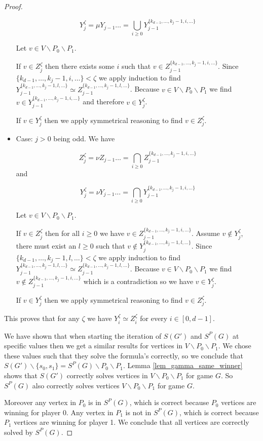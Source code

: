 \begin{theorem}
\begin{proof}
\begin{itemize}
			\[ Y_j^{\zeta} = \mu Y_{j-1}\dots = \bigcup_{i\geq 0} Y_{j-1}^{\{k_{d-1},\dots,k_j-1,i,\dots\}}\]
			
			Let $v \in V \backslash P_0 \backslash P_1$.
			
			If $v \in Z_j^{\zeta}$ then there exists some $i$ such that $v \in Z_{j-1}^{\{k_{d-1},\dots,k_j-1,i,\dots\}}$. Since $\{k_{d-1},\dots,k_j-1,i,\dots\} < \zeta$ we apply induction to find $Y_{j-1}^{\{k_{d-1},\dots,k_j-1,l,\dots\}} \simeq Z_{j-1}^{\{k_{d-1},\dots,k_j-1,l,\dots\}}$. Because $v \in V \backslash P_0 \backslash P_1$ we find $v \in Y_{j-1}^{\{k_{d-1},\dots,k_j-1,i,\dots\}}$ and therefore $v \in Y_j^{\zeta}$.
			
			If $v \in Y_j^{\zeta}$ then we apply symmetrical reasoning to find $v \in Z_j^{\zeta}$.
			\item Case: $j > 0$ being odd. We have 
			
			\[ Z_j^{\zeta} = \nu Z_{j-1}\dots = \bigcap_{i\geq 0} Z_{j-1}^{\{k_{d-1},\dots,k_j-1,i,\dots\}}\]
			and 
			
			\[ Y_j^{\zeta} = \nu Y_{j-1}\dots = \bigcap_{i\geq 0} Y_{j-1}^{\{k_{d-1},\dots,k_j-1,i,\dots\}}\]
			
			Let $v \in V \backslash P_0 \backslash P_1$.
			
			If $v \in Z_j^{\zeta}$ then for all $i \geq 0$ we have $v \in Z_{j-1}^{\{k_{d-1},\dots,k_j-1,i,\dots\}}$. Assume $v \notin Y_j^{\zeta}$, there must exist an $l \geq 0$ such that $v \notin Y_j^{\{k_{d-1},\dots,k_j-1,l,\dots\}}$. Since $\{k_{d-1},\dots,k_j-1,l,\dots\} < \zeta$ we apply induction to find $Y_{j-1}^{\{k_{d-1},\dots,k_j-1,l,\dots\}} \simeq Z_{j-1}^{\{k_{d-1},\dots,k_j-1,l,\dots\}}$. Because $v \in V \backslash P_0 \backslash P_1$ we find $v \notin Z_{j-1}^{\{k_{d-1},\dots,k_j-1,i,\dots\}}$ which is a contradiction so we have $v \in Y_j^{\zeta}$.
			
			If $v \in Y_j^{\zeta}$ then we apply symmetrical reasoning to find $v \in Z_j^{\zeta}$.
		\end{itemize}
		
		This proves that for any $\zeta$ we have $Y_i^{\zeta} \simeq Z_i^{\zeta}$ for every $i \in [0,d-1]$.
		
		We have shown that when starting the iteration of $S(G')$ and $S^P(G)$ at specific values then we get a similar results for vertices in $V \backslash P_0 \backslash P_1$. We chose these values such that they solve the formula's correctly, so we conclude that $S(G') \backslash \{s_0,s_1\} = S^P(G) \backslash P_0 \backslash P_1$. Lemma \ref{lem_gamma_same_winner} shows that $S(G')$ correctly solves vertices in $V \backslash P_0 \backslash P_1$ for game $G$. So $S^P(G)$ also correctly solves vertices $V \backslash P_0 \backslash P_1$ for game $G$. 
		
		Moreover any vertex in $P_0$ is in $S^P(G)$, which is correct because $P_0$ vertices are winning for player 0. Any vertex in $P_1$ is not in $S^P(G)$, which is correct because $P_1$ vertices are winning for player 1. We conclude that all vertices are correctly solved by $S^P(G)$.
	\end{proof}
\end{theorem}

